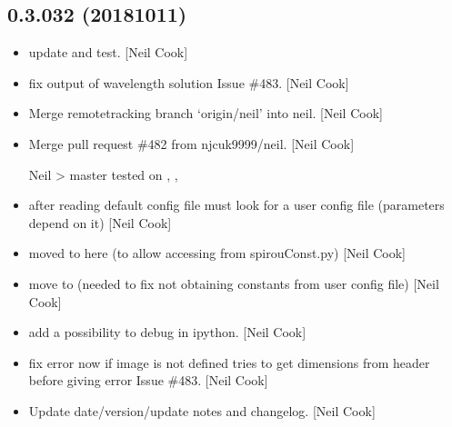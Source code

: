 \documentclass[a4paper,10pt,english]{report}
\begin{document}
\subsection{0.3.032 (2018\sphinxhyphen{}10\sphinxhyphen{}11)}
\label{\detokenize{misc/changelog:id318}}\begin{itemize}
\item {} 
 \sphinxhyphen{} update  and test. {[}Neil Cook{]}

\item {} 
 \sphinxhyphen{} fix output of wavelength solution \sphinxhyphen{} Issue \#483. {[}Neil
Cook{]}

\item {} 
Merge remote\sphinxhyphen{}tracking branch ‘origin/neil’ into neil. {[}Neil Cook{]}

\item {} 
Merge pull request \#482 from njcuk9999/neil. {[}Neil Cook{]}

Neil \textendash{}\textgreater{} master \sphinxhyphen{} tested on , , 

\item {} 
 \sphinxhyphen{} after reading default config file must look for a
user config file (parameters depend on it) {[}Neil Cook{]}

\item {} 
 \sphinxhyphen{} moved  to here (to allow
accessing from spirouConst.py) {[}Neil Cook{]}

\item {} 
 \sphinxhyphen{} move  to  \sphinxhyphen{}
(needed to fix not obtaining constants from user config file) {[}Neil
Cook{]}

\item {} 
 \sphinxhyphen{} add a possibility to debug in ipython. {[}Neil Cook{]}

\item {} 
 \sphinxhyphen{} fix error \sphinxhyphen{} now if image is not defined tries to get
dimensions from header before giving error \sphinxhyphen{} Issue \#483. {[}Neil Cook{]}

\item {} 
Update date/version/update notes and changelog. {[}Neil Cook{]}

\end{itemize}
\end{document}
